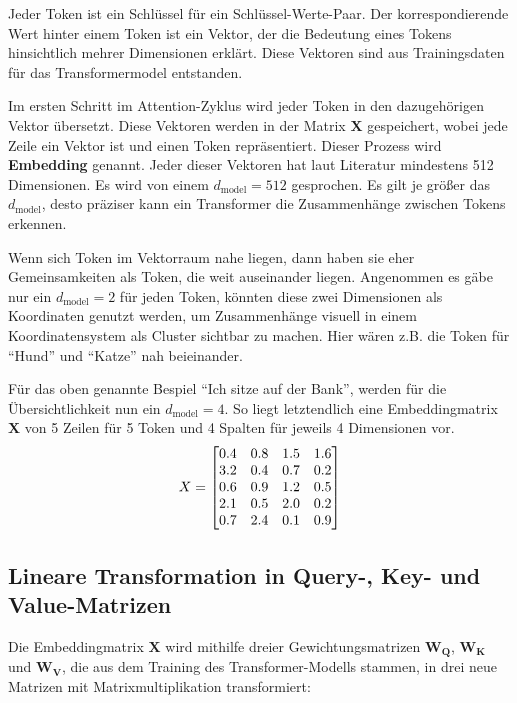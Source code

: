 Jeder Token ist ein Schlüssel für ein Schlüssel-Werte-Paar.
Der korrespondierende Wert hinter einem Token ist ein Vektor, der die Bedeutung eines Tokens hinsichtlich mehrer Dimensionen erklärt.
Diese Vektoren sind aus Trainingsdaten für das Transformermodel entstanden.

Im ersten Schritt im Attention-Zyklus wird jeder Token in den dazugehörigen Vektor übersetzt.
Diese Vektoren werden in der Matrix $\mathbf{X}$ gespeichert, wobei jede Zeile ein Vektor ist und einen Token repräsentiert.
Dieser Prozess wird \textbf{Embedding} genannt. 
Jeder dieser Vektoren hat laut Literatur mindestens 512 Dimensionen.
Es wird von einem \( d_{\text{model}} = 512 \) gesprochen.
Es gilt je größer das \( d_{\text{model}} \), desto präziser kann ein Transformer die Zusammenhänge zwischen Tokens erkennen.

Wenn sich Token im Vektorraum nahe liegen, dann haben sie eher Gemeinsamkeiten als Token, die weit auseinander liegen.
Angenommen es gäbe nur ein \( d_{\text{model}} = 2 \) für jeden Token, könnten diese zwei Dimensionen als Koordinaten genutzt werden, um Zusammenhänge visuell in einem Koordinatensystem als Cluster sichtbar zu machen.
Hier wären z.B. die Token für \enquote{Hund} und \enquote{Katze} nah beieinander.

Für das oben genannte Bespiel \enquote{Ich sitze auf der Bank}, werden für die Übersichtlichkeit nun ein \( d_{\text{model}} = 4 \).
So liegt letztendlich eine Embeddingmatrix $\mathbf{X}$ von 5 Zeilen für 5 Token und 4 Spalten für jeweils 4 Dimensionen vor.
\[
\centering
X =
\begin{bmatrix}
0.4 & 0.8 & 1.5 & 1.6 \\
3.2 & 0.4 & 0.7 & 0.2 \\
0.6 & 0.9 & 1.2 & 0.5 \\
2.1 & 0.5 & 2.0 & 0.2 \\
0.7 & 2.4 & 0.1 & 0.9
\end{bmatrix}
\]


\subsection{Lineare Transformation in Query-, Key- und Value-Matrizen}

Die Embeddingmatrix $\mathbf{X}$ wird mithilfe dreier Gewichtungsmatrizen $\mathbf{W_Q}$, $\mathbf{W_K}$ und $\mathbf{W_V}$, die aus dem Training des Transformer-Modells stammen, in drei neue Matrizen mit Matrixmultiplikation transformiert:


